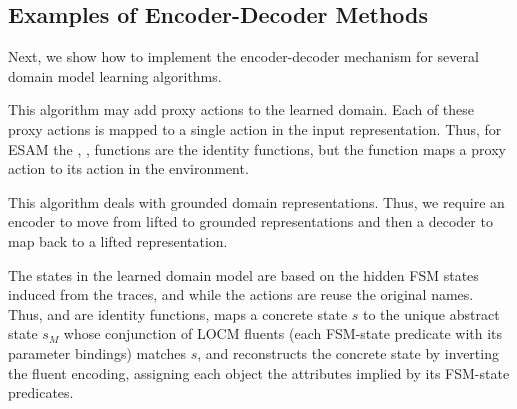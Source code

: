 

\subsection{Examples of Encoder-Decoder Methods}
Next, we show how to implement the encoder-decoder mechanism for several domain model learning algorithms. 

This algorithm may add proxy actions to the learned domain. 
Each of these proxy actions is mapped to a single action in the input representation. 
Thus, for ESAM the \encodea, \encodes, \decodes functions are the identity functions, but the \decodea function maps a proxy action to its action in the environment. 

This algorithm deals with grounded domain representations. 
Thus, we require an encoder to move from lifted to grounded representations and then a decoder to map back to a lifted representation.

The states in the learned domain model are based on the hidden FSM states induced from the traces, and while the actions are reuse the original names. Thus, \encodea and \decodea are identity functions, \encodes maps a concrete state $s$ to the unique abstract state $s_M$ whose conjunction of LOCM fluents (each FSM-state predicate with its parameter bindings) matches $s$, and \decodes reconstructs the concrete state by inverting the fluent encoding, assigning each object the attributes implied by its FSM-state predicates.




